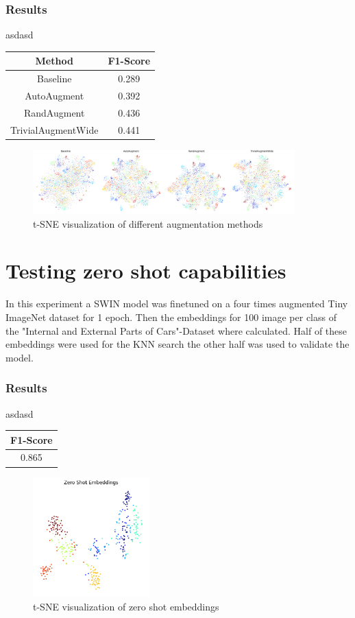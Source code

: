 \documentclass[12pt,a4paper]{report}
\newcommand{\splitlayout}[2]{
	\begin{minipage}{0.6\textwidth}
		#1
	\end{minipage}
	\hfill
	\begin{minipage}{0.35\textwidth}
		#2
	\end{minipage}	
}
\begin{document}
\subsubsection{Results}
\splitlayout{
asdasd
}{
	\begin{tabular}{ | c | c | }
		\hline
		Method &  F1-Score \\ 
		\hline
		Baseline &  0.289  \\ 
		\hline
		AutoAugment & 0.392 \\ 
		\hline
		RandAugment & 0.436 \\ 
		\hline
		TrivialAugmentWide & 0.441  \\ 
		\hline
	\end{tabular}
}

\begin{figure}[hb]
	\centering
	\includegraphics[width=0.9\textwidth]{../plots/augmentation_methods.png}
	\caption{t-SNE visualization of different augmentation methods}
\end{figure}

\newpage

\section{Testing zero shot capabilities}
In this experiment a SWIN model was finetuned on a four times augmented Tiny ImageNet dataset for 1 epoch.
Then the embeddings for 100 image per class of the "Internal and External Parts of Cars"-Dataset where calculated.
Half of these embeddings were used for the KNN search the other half was used to validate the model.

\subsubsection{Results}
\splitlayout{
asdasd
}{
	\begin{tabular}{ | c | }
		\hline
		F1-Score \\ 
		\hline
		0.865  \\ 
		\hline
	\end{tabular}
}

\begin{figure}[hb]
	\centering
	\includegraphics[width=0.4\textwidth]{../plots/zero_shot_embeddings.png}
	\caption{t-SNE visualization of zero shot embeddings}
\end{figure}
\end{document}

